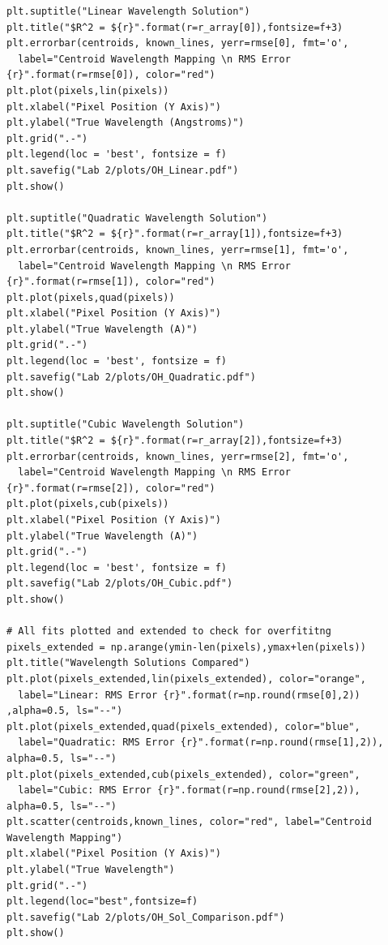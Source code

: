 \documentclass{article}
\begin{document}
\begin{appendices}
\begin{footnotesize}
\begin{verbatim}
plt.suptitle("Linear Wavelength Solution")
plt.title("$R^2 = ${r}".format(r=r_array[0]),fontsize=f+3)
plt.errorbar(centroids, known_lines, yerr=rmse[0], fmt='o', 
  label="Centroid Wavelength Mapping \n RMS Error {r}".format(r=rmse[0]), color="red")
plt.plot(pixels,lin(pixels))
plt.xlabel("Pixel Position (Y Axis)")
plt.ylabel("True Wavelength (Angstroms)")
plt.grid(".-")
plt.legend(loc = 'best', fontsize = f)
plt.savefig("Lab 2/plots/OH_Linear.pdf")
plt.show()

plt.suptitle("Quadratic Wavelength Solution")
plt.title("$R^2 = ${r}".format(r=r_array[1]),fontsize=f+3)
plt.errorbar(centroids, known_lines, yerr=rmse[1], fmt='o', 
  label="Centroid Wavelength Mapping \n RMS Error {r}".format(r=rmse[1]), color="red")
plt.plot(pixels,quad(pixels))
plt.xlabel("Pixel Position (Y Axis)")
plt.ylabel("True Wavelength (A)")
plt.grid(".-")
plt.legend(loc = 'best', fontsize = f)
plt.savefig("Lab 2/plots/OH_Quadratic.pdf")
plt.show()

plt.suptitle("Cubic Wavelength Solution")
plt.title("$R^2 = ${r}".format(r=r_array[2]),fontsize=f+3)
plt.errorbar(centroids, known_lines, yerr=rmse[2], fmt='o', 
  label="Centroid Wavelength Mapping \n RMS Error {r}".format(r=rmse[2]), color="red")
plt.plot(pixels,cub(pixels))
plt.xlabel("Pixel Position (Y Axis)")
plt.ylabel("True Wavelength (A)")
plt.grid(".-")
plt.legend(loc = 'best', fontsize = f)
plt.savefig("Lab 2/plots/OH_Cubic.pdf")
plt.show()

# All fits plotted and extended to check for overfititng
pixels_extended = np.arange(ymin-len(pixels),ymax+len(pixels))
plt.title("Wavelength Solutions Compared")
plt.plot(pixels_extended,lin(pixels_extended), color="orange", 
  label="Linear: RMS Error {r}".format(r=np.round(rmse[0],2)) ,alpha=0.5, ls="--")
plt.plot(pixels_extended,quad(pixels_extended), color="blue", 
  label="Quadratic: RMS Error {r}".format(r=np.round(rmse[1],2)), alpha=0.5, ls="--")
plt.plot(pixels_extended,cub(pixels_extended), color="green", 
  label="Cubic: RMS Error {r}".format(r=np.round(rmse[2],2)), alpha=0.5, ls="--")
plt.scatter(centroids,known_lines, color="red", label="Centroid Wavelength Mapping")
plt.xlabel("Pixel Position (Y Axis)")
plt.ylabel("True Wavelength")
plt.grid(".-")
plt.legend(loc="best",fontsize=f)
plt.savefig("Lab 2/plots/OH_Sol_Comparison.pdf")
plt.show()


\end{verbatim}
\end{footnotesize}
\end{appendices}
\end{document}
